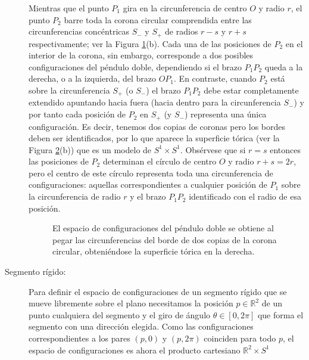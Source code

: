 \documentclass[../VD.tex]{subfiles}
\begin{document}
\begin{description}
  Mientras que el punto $P_1$ gira en la circunferencia de centro $O$ y radio
  $r$, el punto $P_2$ barre toda la corona circular comprendida entre las
  circunferencias concéntricas $S_-$ y $S_+$ de radios $r-s$ y $r+s$
  respectivamente; ver la Figura \ref{fig20y30}(b). Cada una de las posiciones
  de $P_2$ en el interior de la corona, sin embargo, corresponde a dos posibles
  configuraciones del péndulo doble, dependiendo si el brazo $P_1P_2$ queda a la
  derecha, o a la izquierda, del brazo $OP_1$. En contraste, cuando $P_2$ está
  sobre la circunferencia $S_+$ (o $S_-$) el brazo $P_1P_2$ debe estar
  completamente extendido apuntando hacia fuera (hacia dentro para la
  circunferencia $S_-$) y por tanto cada posición de $P_2$ en $S_+$ (y $S_-$)
  representa una única configuración. Es decir, tenemos dos copias de coronas
  pero los bordes deben ser identificados, por lo que aparece la superficie
  tórica (ver la Figura \ref{fig40y50d}(b)) que es un modelo de $S^1 \times
  S^1$. Obsérvese que si $r=s$ entonces las posiciones de $P_2$ determinan el
  círculo de centro $O$ y radio $r+s = 2r$, pero el centro de este círculo
  representa toda una circunferencia de configuraciones: aquellas
  correspondientes a cualquier posición de $P_1$ sobre la circunferencia de
  radio $r$ y el brazo $P_1P_2$ identificado con el radio de esa posición.
	
  \begin{figure}[ht]
    \centering
    \qquad %
    \caption{}
    \label{fig20y30}
  \end{figure}

  \begin{figure}[ht]
    \centering
    \qquad %
    \caption{El espacio de configuraciones del péndulo doble se obtiene al pegar las circunferencias del borde de dos copias de la corona circular, obteniéndose la superficie tórica en la derecha.}
    \label{fig40y50d}
  \end{figure}

\item[Segmento rígido:] Para definir el espacio de configuraciones de un
  segmento rígido que se mueve libremente sobre el plano necesitamos la posición
  $p\in\mathbb{R}^{2}$ de un punto cualquiera del segmento y el giro de ángulo
  $\theta\in[0,2\pi]$ que forma el segmento con una dirección elegida. Como las
  configuraciones correspondientes a los pares $(p,0)$ y $(p,2\pi)$ coinciden
  para todo $p$, el espacio de configuraciones es ahora el producto cartesiano
  $\mathbb{R}^{2}\times S^{1}$
	

\end{description}
\end{document}
